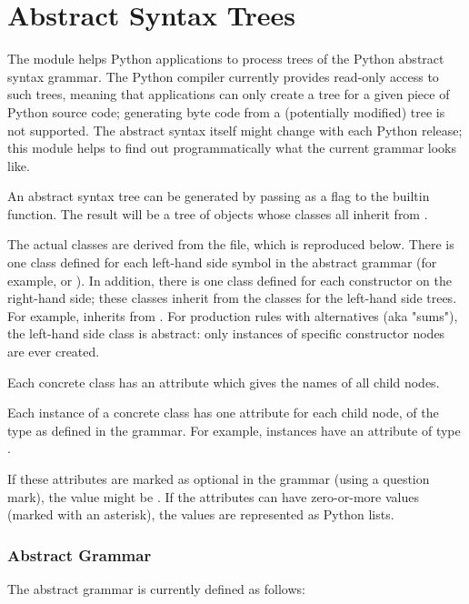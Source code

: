 \chapter{Abstract Syntax Trees\label{ast}}


The  module helps Python applications to process
trees of the Python abstract syntax grammar. The Python compiler
currently provides read-only access to such trees, meaning that
applications can only create a tree for a given piece of Python
source code; generating byte code from a (potentially modified)
tree is not supported. The abstract syntax itself might change with
each Python release; this module helps to find out programmatically
what the current grammar looks like.

An abstract syntax tree can be generated by passing 
as a flag to the  builtin function. The result will be a tree
of objects whose classes all inherit from .

The actual classes are derived from the  file,
which is reproduced below. There is one class defined for each left-hand
side symbol in the abstract grammar (for example,  or ).
In addition, there is one class defined for each constructor on the
right-hand side; these classes inherit from the classes for the left-hand
side trees. For example,  inherits from .
For production rules with alternatives (aka "sums"), the left-hand side
class is abstract: only instances of specific constructor nodes are ever
created.

Each concrete class has an attribute  which gives the
names of all child nodes.

Each instance of a concrete class has one attribute for each child node,
of the type as defined in the grammar. For example, 
instances have an attribute  of type .

If these attributes are marked as optional in the grammar (using a
question mark), the value might be . If the attributes
can have zero-or-more values (marked with an asterisk), the
values are represented as Python lists.

\subsection{Abstract Grammar}

The abstract grammar is currently defined as follows:

